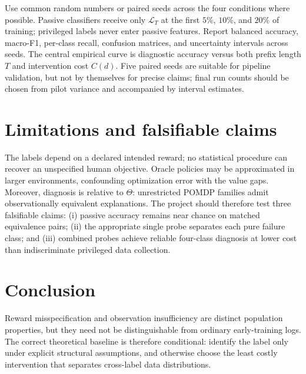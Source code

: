 \documentclass[9pt,twocolumn]{extarticle}
\newcommand{\Dpre}{\mathcal{L}_{T}}
\begin{document}
Use common random numbers or paired seeds across the four conditions where
possible. Passive classifiers receive only $\Dpre$ at the first $5\%$, $10\%$,
and $20\%$ of training; privileged labels never enter passive features. Report
balanced accuracy, macro-F1, per-class recall, confusion matrices, and
uncertainty intervals across seeds. The central empirical curve is diagnostic
accuracy versus both prefix length $T$ and intervention cost $C(d)$. Five paired
seeds are suitable for pipeline validation, but not by themselves for precise
claims; final run counts should be chosen from pilot variance and accompanied
by interval estimates.

\section{Limitations and falsifiable claims}

The labels depend on a declared intended reward; no statistical procedure can
recover an unspecified human objective. Oracle policies may be approximated in
larger environments, confounding optimization error with the value gaps.
Moreover, diagnosis is relative to $\Theta$: unrestricted POMDP families admit
observationally equivalent explanations. The project should therefore test
three falsifiable claims: (i) passive accuracy remains near chance on matched
equivalence pairs; (ii) the appropriate single probe separates each pure
failure class; and (iii) combined probes achieve reliable four-class diagnosis
at lower cost than indiscriminate privileged data collection.

\section{Conclusion}

Reward misspecification and observation insufficiency are distinct population
properties, but they need not be distinguishable from ordinary early-training
logs. The correct theoretical baseline is therefore conditional: identify the
label only under explicit structural assumptions, and otherwise choose the
least costly intervention that separates cross-label data distributions.
\end{document}
